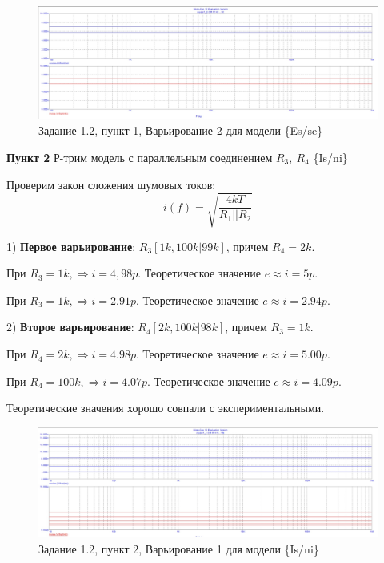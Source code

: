 \documentclass[a4paper, 14pt]{extarticle}%
\begin{document}
\begin{figure}[h!]
			\centering
			\includegraphics[width=1.1\linewidth]{1.2/pic5.jpg}
			\caption{Задание 1.2, пункт 1, Варьирование 2 для модели \{Es/se\}}
			\label{A}
\end{figure}



\textbf{Пункт 2}
Р-трим модель с параллельным соединением $R_3, \: R_4$ \{Is/ni\}

Проверим закон сложения шумовых токов:
\[ i(f) = \sqrt{\frac{4kT}{R_1 || R_2}}  \]

1) \textbf{Первое варьирование}: $R_3[1k, 100k | 99k]$, причем $R_4 = 2k$.

При $R_3 = 1k, \Rightarrow  i = 4,98p$.
Теоретическое значение $e \approx i = 5p$.

При $R_3 = 1k, \Rightarrow  i = 2.91p$.
Теоретическое значение $e \approx i = 2.94p$.

2) \textbf{Второе варьирование}: $R_4[2k, 100k | 98k]$, причем $R_3 = 1k$.

При $R_4 = 2k, \Rightarrow  i = 4.98p$.
Теоретическое значение $e \approx i = 5.00p$.

При $R_4 = 100k, \Rightarrow  i = 4.07p$.
Теоретическое значение $e \approx i = 4.09p$.

Теоретические значения хорошо совпали с экспериментальными.


\begin{figure}[h!]
			\centering
			\includegraphics[width=1.1\linewidth]{1.2/pic6.jpg}
			\caption{Задание 1.2, пункт 2, Варьирование 1 для модели \{Is/ni\}}
			\label{A}
\end{figure}
\end{document}
